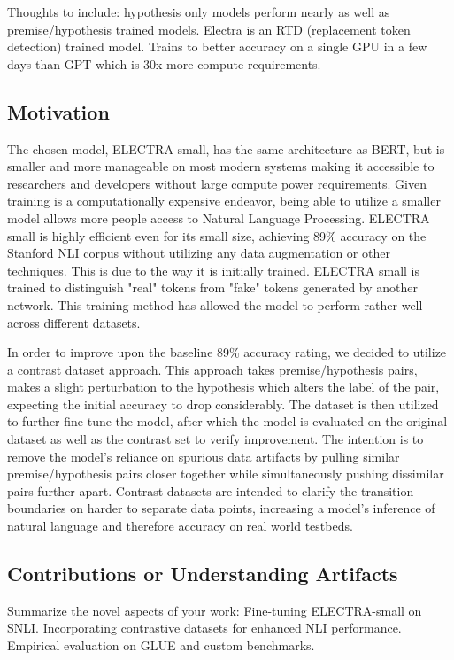 \documentclass[11pt]{article}
\begin{document}
Thoughts to include: hypothesis only models perform nearly as well as premise/hypothesis trained models. Electra is an RTD (replacement token detection) trained model. Trains to better accuracy on a single GPU in a few days than GPT which is 30x more compute requirements.

\subsection{Motivation}

The chosen model, ELECTRA small, has the same architecture as BERT, but is smaller and more manageable on most modern systems making it accessible to researchers and developers without large compute power requirements. Given training is a computationally expensive endeavor, being able to utilize a smaller model allows more people access to Natural Language Processing. ELECTRA small is highly efficient even for its small size, achieving 89\% accuracy on the Stanford NLI corpus without utilizing any data augmentation or other techniques. This is due to the way it is initially trained. ELECTRA small is trained to distinguish "real" tokens from "fake" tokens generated by another network. This training method has allowed the model to perform rather well across different datasets. \citealp{googleelectrablog}

In order to improve upon the baseline 89\% accuracy rating, we decided to utilize a contrast dataset approach. This approach takes premise/hypothesis pairs, makes a slight perturbation to the hypothesis which alters the label of the pair, expecting the initial accuracy to drop considerably.  The dataset is then utilized to further fine-tune the model, after which the model is evaluated on the original dataset as well as the contrast set to verify improvement. The intention is to remove the model's reliance on spurious data artifacts by pulling similar premise/hypothesis pairs closer together while simultaneously pushing dissimilar pairs further apart.  Contrast datasets are intended to clarify the transition boundaries on harder to separate data points, increasing a model's inference of natural language and therefore accuracy on real world testbeds. \citealp{localdecisionboundaries}

\subsection{Contributions or Understanding Artifacts}
Summarize the novel aspects of your work:
Fine-tuning ELECTRA-small on SNLI.
Incorporating contrastive datasets for enhanced NLI performance.
Empirical evaluation on GLUE and custom benchmarks.
\end{document}
